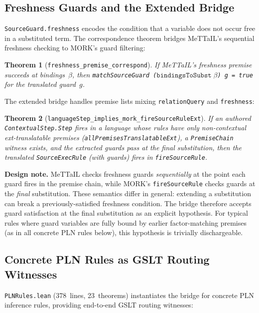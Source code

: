 \documentclass[11pt]{article}
\newtheorem{theorem}{Theorem}[section]
\theoremstyle{definition}
\theoremstyle{remark}
\newcommand{\MORK}{\textup{MORK}}
\newcommand{\MeTTaIL}{\textup{MeTTaIL}}
\begin{document}
\subsection{Freshness Guards and the Extended Bridge}

\texttt{SourceGuard.freshness} encodes the condition that a variable does not
occur free in a substituted term.  The correspondence theorem bridges
\MeTTaIL{}'s sequential freshness checking to \MORK{}'s guard filtering:

\begin{theorem}[\texttt{freshness\_premise\_correspond}]
If \MeTTaIL{}'s freshness premise succeeds at bindings~$\beta$, then
\texttt{matchSourceGuard ($\texttt{bindingsToSubst}\;\beta$) g = true}
for the translated guard~$g$.
\end{theorem}

\noindent
The extended bridge handles premise lists mixing \texttt{relationQuery}
and \texttt{freshness}:

\begin{theorem}[\texttt{languageStep\_implies\_mork\_fireSourceRuleExt}]
\label{thm:extbridge}
If an authored \texttt{ContextualStep.Step} fires in a language whose rules
have only non-contextual ext-translatable premises
(\texttt{allPremisesTranslatableExt}), a \texttt{PremiseChain} witness exists,
and the extracted guards pass at the final substitution, then the translated
\texttt{SourceExecRule} (with guards) fires in \texttt{fireSourceRule}.
\end{theorem}

\noindent
\textbf{Design note.}
\MeTTaIL{} checks freshness guards \emph{sequentially} at the point each
guard fires in the premise chain, while \MORK{}'s \texttt{fireSourceRule}
checks guards at the \emph{final} substitution.  These semantics differ in
general: extending a substitution can break a previously-satisfied freshness
condition.  The bridge therefore accepts guard satisfaction at the final
substitution as an explicit hypothesis.  For typical rules where guard
variables are fully bound by earlier factor-matching premises (as in all
concrete PLN rules below), this hypothesis is trivially dischargeable.

\subsection{Concrete PLN Rules as GSLT Routing Witnesses}

\texttt{PLNRules.lean} (378~lines, 23~theorems) instantiates the bridge for
concrete PLN inference rules, providing end-to-end GSLT routing witnesses:
\end{document}
